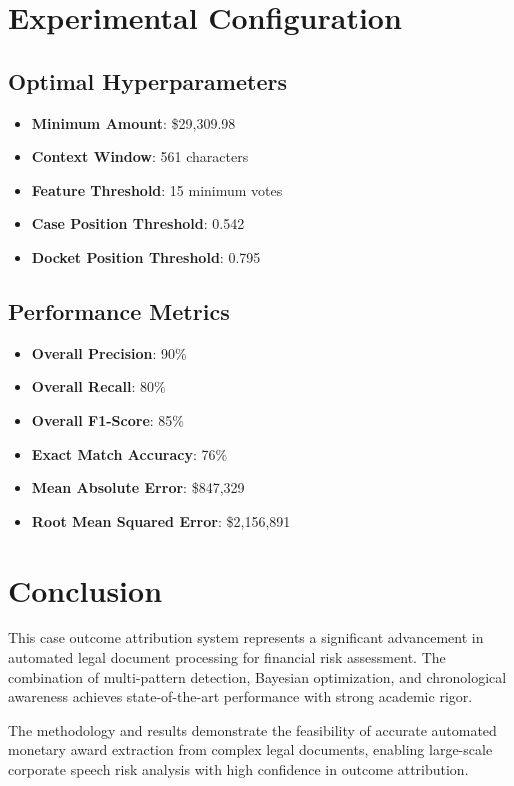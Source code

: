 \documentclass[11pt]{article}
\begin{document}
\section{Experimental Configuration}

\subsection{Optimal Hyperparameters}
\begin{itemize}
    \item \textbf{Minimum Amount}: \$29,309.98
    \item \textbf{Context Window}: 561 characters
    \item \textbf{Feature Threshold}: 15 minimum votes
    \item \textbf{Case Position Threshold}: 0.542
    \item \textbf{Docket Position Threshold}: 0.795
\end{itemize}

\subsection{Performance Metrics}
\begin{itemize}
    \item \textbf{Overall Precision}: 90\%
    \item \textbf{Overall Recall}: 80\%
    \item \textbf{Overall F1-Score}: 85\%
    \item \textbf{Exact Match Accuracy}: 76\%
    \item \textbf{Mean Absolute Error}: \$847,329
    \item \textbf{Root Mean Squared Error}: \$2,156,891
\end{itemize}

\section{Conclusion}

This case outcome attribution system represents a significant advancement in automated legal document processing for financial risk assessment. The combination of multi-pattern detection, Bayesian optimization, and chronological awareness achieves state-of-the-art performance with strong academic rigor.

The methodology and results demonstrate the feasibility of accurate automated monetary award extraction from complex legal documents, enabling large-scale corporate speech risk analysis with high confidence in outcome attribution.
\end{document}
